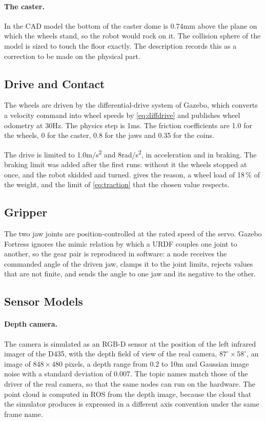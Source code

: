 \paragraph{The caster.} In the CAD model the bottom of the caster dome is 0.74\unit{mm}
above the plane on which the wheels stand, so the robot would rock on it. The collision
sphere of the model is sized to touch the floor exactly. The description records this as a
correction to be made on the physical part.

\subsection{Drive and Contact}
\label{sec:sim-drive}
The wheels are driven by the differential-drive system of Gazebo, which converts a velocity
command into wheel speeds by \cref{eq:diffdrive} and publishes wheel odometry at
30\unit{Hz}. The physics step is 1\unit{ms}. The friction coefficients are 1.0 for the
wheels, 0 for the caster, 0.8 for the jaws and 0.35 for the coins.

The drive is limited to 1.0\unit{m/s^2} and 8\unit{rad/s^2}, in acceleration and in
braking. The braking limit was added after the first runs: without it the wheels stopped
at once, and the robot skidded and turned. 
gives the reason, a wheel load of 18\,\% of the weight, and the limit of
\cref{eq:traction} that the chosen value respects.

\subsection{Gripper}
The two jaw joints are position-controlled at the rated speed of the servo. Gazebo Fortress
ignores the mimic relation by which a URDF couples one joint to another, so the gear pair is
reproduced in software: a node receives the commanded angle of the driven jaw, clamps it to
the joint limits, rejects values that are not finite, and sends the angle to one jaw and its
negative to the other.

\subsection{Sensor Models}
\label{sec:sensor-models}
\paragraph{Depth camera.} The camera is simulated as an RGB-D sensor at the position of the
left infrared imager of the D435, with the depth field of view of the real camera,
$87^\circ\times58^\circ$, an image of $848\times480$ pixels, a depth range from 0.2 to
10\unit{m} and Gaussian image noise with a standard deviation of 0.007. The topic names
match those of the driver of the real camera, so that the same nodes can run on the
hardware. The point cloud is computed in ROS from the depth image, because the cloud that
the simulator produces is expressed in a different axis convention under the same frame
name.

